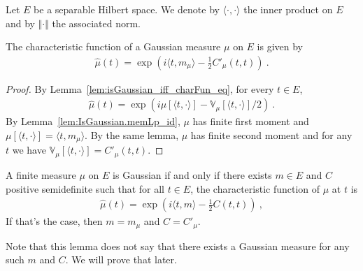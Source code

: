 Let $E$ be a separable Hilbert space. We denote by $\langle \cdot, \cdot \rangle$ the inner product on $E$ and by $\Vert \cdot \Vert$ the associated norm.

\begin{lemma}\label{lem:IsGaussian.charFun_eq}
  \leanok
The characteristic function of a Gaussian measure $\mu$ on $E$ is given by
\begin{align*}
  \hat{\mu}(t) = \exp\left(i \langle t, m_\mu \rangle - \frac{1}{2} C'_\mu(t, t)\right) \: .
\end{align*}
\end{lemma}

\begin{proof}\leanok
By Lemma~\ref{lem:isGaussian_iff_charFun_eq}, for every $t \in E$,
\begin{align*}
  \hat{\mu}(t) = \exp\left(i \mu[\langle t, \cdot \rangle] - \mathbb{V}_\mu[\langle t, \cdot \rangle] / 2\right) \: .
\end{align*}
By Lemma~\ref{lem:IsGaussian.memLp_id}, $\mu$ has finite first moment and $\mu[\langle t, \cdot \rangle] = \langle t, m_\mu \rangle$. By the same lemma, $\mu$ has finite second moment and for any $t$ we have $\mathbb{V}_\mu[\langle t, \cdot\rangle] = C'_\mu(t, t)$.
\end{proof}

\begin{lemma}\label{lem:isGaussian_iff_gaussian_charFun}
  \leanok
A finite measure $\mu$ on $E$ is Gaussian if and only if there exists $m \in E$ and $C$ positive semidefinite such that for all $t \in E$, the characteristic function of $\mu$ at $t$ is
\begin{align*}
  \hat{\mu}(t) = \exp\left(i \langle t, m \rangle - \frac{1}{2} C(t, t)\right) \: ,
\end{align*}
If that's the case, then $m = m_\mu$ and $C = C'_\mu$.
\end{lemma}

Note that this lemma does not say that there exists a Gaussian measure for any such $m$ and $C$.
We will prove that later.

